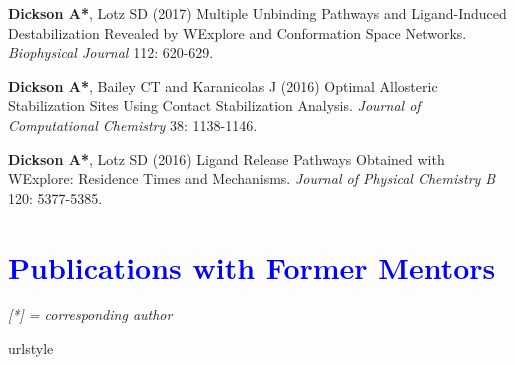 \documentclass[margin,line]{res}
\begin{document}
\begin{resume}
\begin{spacing}{1.2}
\begin{thebibliography}{10}
{\bf Dickson A*}, Lotz SD (2017)
Multiple Unbinding Pathways and Ligand-Induced Destabilization Revealed by WExplore and Conformation Space Networks.
\newblock \textit{Biophysical Journal} 112: 620-629. 

{\bf Dickson A*}, Bailey CT and Karanicolas J (2016)
Optimal Allosteric Stabilization Sites Using Contact Stabilization Analysis.
\newblock \textit{Journal of Computational Chemistry} 38: 1138-1146.

{\bf Dickson A*}, Lotz SD (2016)
Ligand Release Pathways Obtained with WExplore: Residence Times and Mechanisms.
\newblock \textit{Journal of Physical Chemistry B} 120: 5377-5385. 

\end{thebibliography}
\end{spacing}
\endgroup

\section{\sc \textcolor{blue}{Publications with Former Mentors}}


\emph{[*] = corresponding author}
\vspace {0.05in}

\begingroup
\begin{spacing}{1.2}
\renewcommand{\section}[2]{}%
\begin{thebibliography}{10}
\providecommand{\url}[1]{\texttt{#1}}
\providecommand{\urlprefix}{URL }
\expandafter\ifx\csname urlstyle\endcsname\relax
  \providecommand{\doi}[1]{doi:\discretionary{}{}{}#1}\else
  \providecommand{\doi}{doi:\discretionary{}{}{}\begingroup
  \urlstyle{rm}\Url}\fi
\providecommand{\bibAnnoteFile}[1]{%
  \IfFileExists{#1}{\begin{quotation}\noindent\textsc{Key:} #1\\
  \textsc{Annotation:}\ \end{quotation}}{}}
\providecommand{\bibAnnote}[2]{%
  \begin{quotation}\noindent\textsc{Key:} #1\\
  \textsc{Annotation:}\ #2\end{quotation}}
\providecommand{\eprint}[2][]{\url{#2}}


\end{thebibliography}
\end{spacing}
\end{resume}
\end{document}
